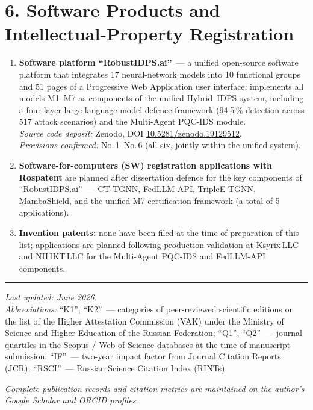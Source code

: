 \documentclass[11pt,a4paper]{article}
\begin{document}
\vspace{-0.2cm}

\section*{6. Software Products and Intellectual-Property Registration}

\begin{enumerate}[leftmargin=*, itemsep=0.3em]

\item \textbf{Software platform ``RobustIDPS.ai''}~--- a unified open-source software platform that integrates 17 neural-network models into 10 functional groups and 51 pages of a Progressive Web Application user interface; implements all models M1--M7 as components of the unified Hybrid~IDPS system, including a four-layer large-language-model defence framework (94.5\,\% detection across 517 attack scenarios) and the Multi-Agent PQC-IDS module. \\
\textit{Source code deposit:} Zenodo, DOI \href{https://doi.org/10.5281/zenodo.19129512}{10.5281/zenodo.19129512}. \\
\textit{Provisions confirmed:} No.\,1--No.\,6 (all six, jointly within the unified system).

\item \textbf{Software-for-computers (SW) registration applications with Rospatent} are planned after dissertation defence for the key components of ``RobustIDPS.ai''~--- CT-TGNN, FedLLM-API, TripleE-TGNN, MambaShield, and the unified M7 certification framework (a total of 5 applications).

\item \textbf{Invention patents:} none have been filed at the time of preparation of this list; applications are planned following production validation at Ksyrix\,LLC and NII\,IKT\,LLC for the Multi-Agent PQC-IDS and FedLLM-API components.

\end{enumerate}

\vspace{0.4cm}
\hrule
\vspace{0.2cm}

\small
\textit{Last updated: June 2026.}\\
\textit{Abbreviations:} ``K1'', ``K2''~--- categories of peer-reviewed scientific editions on the list of the Higher Attestation Commission (VAK) under the Ministry of Science and Higher Education of the Russian Federation; ``Q1'', ``Q2''~--- journal quartiles in the Scopus / Web of Science databases at the time of manuscript submission; ``IF''~--- two-year impact factor from Journal Citation Reports (JCR); ``RSCI''~--- Russian Science Citation Index (RINTs).

\textit{Complete publication records and citation metrics are maintained on the author's Google Scholar and ORCID profiles.}
\end{document}
